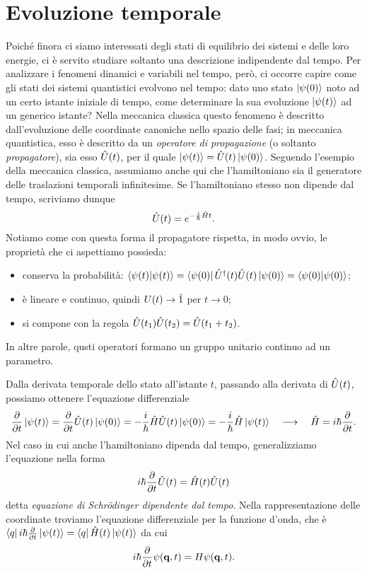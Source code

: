 \chapter{Evoluzione temporale}
Poich\'e finora ci siamo interessati degli stati di equilibrio dei sistemi  e delle loro energie, ci è servito studiare soltanto una descrizione indipendente dal tempo.
Per analizzare i fenomeni dinamici e variabili nel tempo, però, ci occorre capire come gli stati dei sistemi quantistici evolvono nel tempo: dato uno stato $\left|{\psi(0)}\right\rangle$ noto ad un certo istante iniziale di tempo, come determinare la sua evoluzione $\left|{\psi(t)}\right\rangle$ ad un generico istante?
Nella meccanica classica questo fenomeno è descritto dall'evoluzione delle coordinate canoniche nello spazio delle fasi; in meccanica quantistica, esso è descritto da un \emph{operatore di propagazione} (o soltanto \emph{propagatore}), sia esso $\hat{U}(t)$, per il quale $\left|{\psi(t)}\right\rangle=\hat{U}(t)\left|{\psi(0)}\right\rangle$.
Seguendo l'esempio della meccanica classica, assumiamo anche qui che l'hamiltoniano sia il generatore delle traslazioni temporali infinitesime.
Se l'hamiltoniano stesso non dipende dal tempo, scriviamo dunque
\begin{equation}
	\hat{U}(t)=e^{-\frac{i}{\hbar}\hat{H}t}.
	\label{eq:propagatore}
\end{equation}
Notiamo come con questa forma il propagatore rispetta, in modo ovvio, le proprietà che ci aspettiamo possieda:
\begin{itemize}
	\item conserva la probabilità: $\left\langle{\psi(t)}\middle|{\psi(t)}\right\rangle=\left\langle{\psi(0)}\right|{\hat{U}}^\dagger(t)\hat{U}(t)\left|{\psi(0)}\right\rangle=\left\langle{\psi(0)}\middle|{\psi(0)}\right\rangle$;
	\item è lineare e continuo, quindi $U(t)\to\hat{1}$ per $t\to 0$;
	\item si compone con la regola $\hat{U}(t_1)\hat{U}(t_2)=\hat{U}(t_1+t_2)$.
\end{itemize}
In altre parole, qusti operatori formano un gruppo unitario continuo ad un parametro.

Dalla derivata temporale dello stato all'istante $t$, passando alla derivata di $\hat{U}(t)$, possiamo ottenere l'equazione differenziale
\begin{equation}
	\frac{\partial {}}{\partial {t}}\left|{\psi(t)}\right\rangle=\frac{\partial {}}{\partial {t}}\hat{U}(t)\left|{\psi(0)}\right\rangle=-\frac{i}{\hbar}\hat{H}\hat{U}(t)\left|{\psi(0)}\right\rangle=-\frac{i}{\hbar}\hat{H}\left|{\psi(t)}\right\rangle\quad\longrightarrow\quad \hat{H}=i\hbar\frac{\partial {}}{\partial {t}}.
\end{equation}
Nel caso in cui anche l'hamiltoniano dipenda dal tempo, generalizziamo l'equazione nella forma
\begin{equation}
	i\hbar\frac{\partial {}}{\partial {t}}\hat{U}(t)=\hat{H}(t)\hat{U}(t)
	\label{eq:schrodinger-tempo}
\end{equation}
detta \emph{equazione di Schr\"odinger dipendente dal tempo}.
Nella rappresentazione delle coordinate troviamo l'equazione differenziale per la funzione d'onda, che è $\left\langle{q}\right|i\hbar\frac{\partial {}}{\partial {t}}\left|{\psi(t)}\right\rangle=\left\langle{q}\right|\hat{H}(t)\left|{\psi(t)}\right\rangle$ da cui
\begin{equation}
	i\hbar\frac{\partial {}}{\partial {t}}\psi(\mathbf{q},t)=H\psi(\mathbf{q},t).
	\label{eq:schrodinger-tempo-coordinate}
\end{equation}

